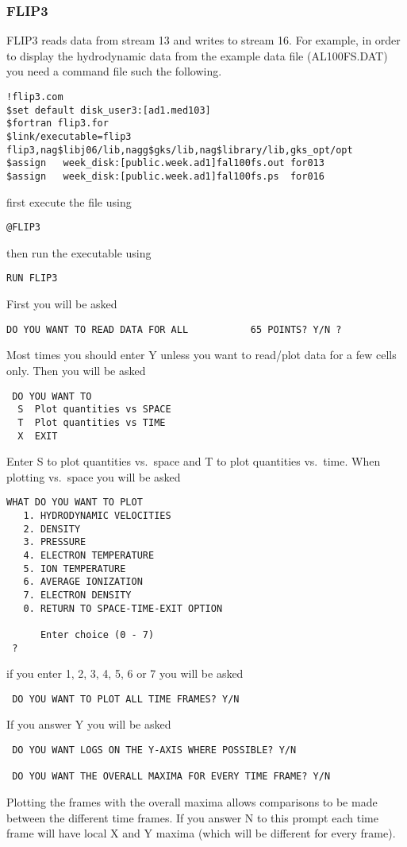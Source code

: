 \subsubsection{FLIP3}
FLIP3 reads data from stream 13 and writes to stream 16.
For example, in order to display the hydrodynamic data from the example data file (AL100FS.DAT)
you need a command file such the following.
\begin{verbatim}
!flip3.com
$set default disk_user3:[ad1.med103]
$fortran flip3.for
$link/executable=flip3 flip3,nag$libj06/lib,nagg$gks/lib,nag$library/lib,gks_opt/opt
$assign   week_disk:[public.week.ad1]fal100fs.out for013
$assign   week_disk:[public.week.ad1]fal100fs.ps  for016
\end{verbatim}
first execute the file using
\begin{verbatim}
@FLIP3
\end{verbatim}
then run the executable using
\begin{verbatim}
RUN FLIP3
\end{verbatim}
First you will be asked
\begin{verbatim}
DO YOU WANT TO READ DATA FOR ALL           65 POINTS? Y/N ?
\end{verbatim}
Most times you should enter Y unless you want to read/plot data
for a few cells only. Then you will be asked
\begin{verbatim}
 DO YOU WANT TO
  S  Plot quantities vs SPACE
  T  Plot quantities vs TIME
  X  EXIT
\end{verbatim}
Enter S to plot quantities vs.\ space and T to plot quantities
vs.\ time. When plotting vs.\ space you will be asked
\begin{verbatim}
WHAT DO YOU WANT TO PLOT
   1. HYDRODYNAMIC VELOCITIES
   2. DENSITY
   3. PRESSURE
   4. ELECTRON TEMPERATURE
   5. ION TEMPERATURE
   6. AVERAGE IONIZATION
   7. ELECTRON DENSITY
   0. RETURN TO SPACE-TIME-EXIT OPTION

      Enter choice (0 - 7)
 ?
\end{verbatim}
if you enter 1, 2, 3, 4, 5, 6 or 7  you will be asked
\begin{verbatim}
 DO YOU WANT TO PLOT ALL TIME FRAMES? Y/N
\end{verbatim}
If you answer Y you will be asked
\begin{verbatim}
 DO YOU WANT LOGS ON THE Y-AXIS WHERE POSSIBLE? Y/N
 
 DO YOU WANT THE OVERALL MAXIMA FOR EVERY TIME FRAME? Y/N
\end{verbatim}
Plotting the frames with the overall maxima allows comparisons
to be made between the different time frames. If you answer
N to this prompt each time frame will have local X and
Y maxima (which will be different for every frame).
 
